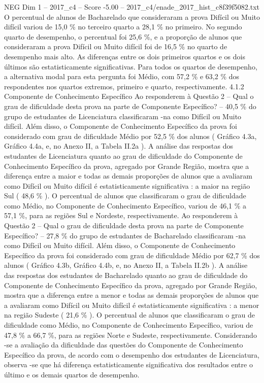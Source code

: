 \begin{textsample}{NEG Dim 1 – 2017\_c4 – Score -5.00 – 2017\_c4/enade\_2017\_hist\_c8f39f5082.txt}
O percentual de alunos de Bacharelado que consideraram a prova Difícil ou Muito difícil variou de 15,0 \% no terceiro quarto a 28,1 \% no primeiro.
No segundo quarto de desempenho, o percentual foi 25,6 \%, e a proporção de alunos que consideraram a prova Difícil ou Muito difícil foi de 16,5 \% no quarto de desempenho mais alto.
As diferenças entre os dois primeiros quartos e os dois últimos são estatisticamente significativas.
Para todos os quartos de desempenho, a alternativa modal para esta pergunta foi Médio, com 57,2 \% e 63,2 \% dos respondentes nos quartos extremos, primeiro e quarto, respectivamente. 4.1.2 Componente de Conhecimento Específico Ao responderem à Questão 2 – Qual o grau de dificuldade desta prova na parte de Componente Específico? – 40,5 \% do grupo de estudantes de Licenciatura classificaram -na como Difícil ou Muito difícil.
Além disso, o Componente de Conhecimento Específico da prova foi considerado com grau de dificuldade Médio por 52,5 \% dos alunos ( Gráfico 4.3a, Gráfico 4.4a, e, no Anexo II, a Tabela II.2a ).
A análise das respostas dos estudantes de Licenciatura quanto ao grau de dificuldade do Componente de Conhecimento Específico da prova, agregado por Grande Região, mostra que a diferença entre a maior e todas as demais proporções de alunos que a avaliaram como Difícil ou Muito difícil é estatisticamente significativa : a maior na região Sul ( 48,6 \% ).
O percentual de alunos que classificaram o grau de dificuldade como Médio, no Componente de Conhecimento Específico, variou de 46,1 \% a 57,1 \%, para as regiões Sul e Nordeste, respectivamente.
Ao responderem à Questão 2 – Qual o grau de dificuldade desta prova na parte de Componente Específico? – 27,8 \% do grupo de estudantes de Bacharelado classificaram -na como Difícil ou Muito difícil.
Além disso, o Componente de Conhecimento Específico da prova foi considerado com grau de dificuldade Médio por 62,7 \% dos alunos ( Gráfico 4.3b, Gráfico 4.4b, e, no Anexo II, a Tabela II.2b ).
A análise das respostas dos estudantes de Bacharelado quanto ao grau de dificuldade do Componente de Conhecimento Específico da prova, agregado por Grande Região, mostra que a diferença entre a menor e todas as demais proporções de alunos que a avaliaram como Difícil ou Muito difícil é estatisticamente significativa : a menor na região Sudeste ( 21,6 \% ).
O percentual de alunos que classificaram o grau de dificuldade como Médio, no Componente de Conhecimento Específico, variou de 47,8 \% a 66,7 \%, para as regiões Norte e Sudeste, respectivamente.
Considerando -se a avaliação da dificuldade das questões do Componente de Conhecimento Específico da prova, de acordo com o desempenho dos estudantes de Licenciatura, observa -se que há diferença estatisticamente significativa dos resultados entre o último e os demais quartos de desempenho.

\end{textsample}
